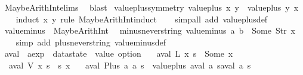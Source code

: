 \begin{isabellebody}
\isamarkupfalse%
\ MaybeArithInt{\isachardot}elims\ \isamarkupfalse%
\ blast%
\endisatagproof
{\isafoldproof}%
%
\isadelimproof
\isanewline
%
\endisadelimproof
\isanewline
{}\isamarkupfalse%
\ value{\isacharunderscore}plus{\isacharunderscore}symmetry{\isacharcolon}\ {\isachardoublequoteopen}value{\isacharunderscore}plus\ x\ y\ {\isacharequal}\ value{\isacharunderscore}plus\ y\ x{\isachardoublequoteclose}\isanewline
%
\isadelimproof
\ \ %
\endisadelimproof
%
\isatagproof
{}\isamarkupfalse%
\ {\isacharparenleft}induct\ x\ y\ rule{\isacharcolon}\ MaybeArithInt{\isachardot}induct{\isacharparenright}\isanewline
\ \ \isamarkupfalse%
\ {\isacharparenleft}simp{\isacharunderscore}all\ add{\isacharcolon}\ value{\isacharunderscore}plus{\isacharunderscore}def{\isacharparenright}%
\endisatagproof
{\isafoldproof}%
%
\isadelimproof
\isanewline
%
\endisadelimproof
\isanewline
{}\isamarkupfalse%
\ {\isachardoublequoteopen}value{\isacharunderscore}minus\ {\isacharequal}\ MaybeArithInt\ {\isacharparenleft}{\isacharminus}{\isacharparenright}{\isachardoublequoteclose}\isanewline
\isanewline
{}\isamarkupfalse%
\ minus{\isacharunderscore}never{\isacharunderscore}string{\isacharcolon}\ {\isachardoublequoteopen}value{\isacharunderscore}minus\ a\ b\ {\isasymnoteq}\ Some\ {\isacharparenleft}Str\ x{\isacharparenright}{\isachardoublequoteclose}\isanewline
%
\isadelimproof
\ \ %
\endisadelimproof
%
\isatagproof
{}\isamarkupfalse%
\ {\isacharparenleft}simp\ add{\isacharcolon}\ plus{\isacharunderscore}never{\isacharunderscore}string\ value{\isacharunderscore}minus{\isacharunderscore}def{\isacharparenright}%
\endisatagproof
{\isafoldproof}%
%
\isadelimproof
\isanewline
%
\endisadelimproof
\isanewline
{}\isamarkupfalse%
\ aval\ {\isacharcolon}{\isacharcolon}\ {\isachardoublequoteopen}aexp\ {\isasymRightarrow}\ datastate\ {\isasymRightarrow}\ value\ option{\isachardoublequoteclose}\ \isanewline
\ \ {\isachardoublequoteopen}aval\ {\isacharparenleft}L\ x{\isacharparenright}\ s\ {\isacharequal}\ Some\ x{\isachardoublequoteclose}\ {\isacharbar}\isanewline
\ \ {\isachardoublequoteopen}aval\ {\isacharparenleft}V\ x{\isacharparenright}\ s\ {\isacharequal}\ s\ x{\isachardoublequoteclose}\ {\isacharbar}\isanewline
\ \ {\isachardoublequoteopen}aval\ {\isacharparenleft}Plus\ a\ a\ s\ {\isacharequal}\ value{\isacharunderscore}plus\ {\isacharparenleft}aval\ a\ s{\isacharparenright}{\isacharparenleft}aval\ a\ s{\isacharparenright}{\isachardoublequoteclose}\ {\isacharbar}\isanewline

\end{isabellebody}
